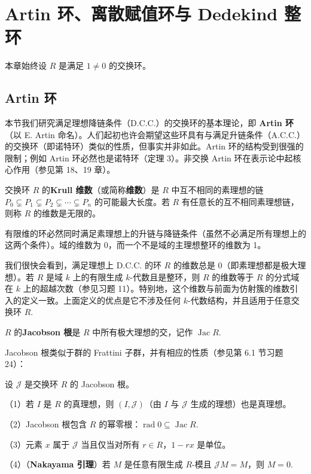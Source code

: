 
\setcounter{chapter}{15}

\chapter{Artin 环、离散赋值环与 Dedekind 整环}

本章始终设 \(R\) 是满足 \(1 \neq 0\) 的交换环。

\section{Artin 环}

本节我们研究满足理想降链条件（D.C.C.）的交换环的基本理论，即 \textbf{Artin 环}（以 E. Artin 命名）。人们起初也许会期望这些环具有与满足升链条件（A.C.C.）的交换环（即诺特环）类似的性质，但事实并非如此。Artin 环的结构受到很强的限制；例如 Artin 环必然也是诺特环（定理 3）。非交换 Artin 环在表示论中起核心作用（参见第 18、19 章）。

\begin{definition}
交换环 \(R\) 的\textbf{Krull 维数}（或简称\textbf{维数}）是 \(R\) 中互不相同的素理想的链 \(P_0 \subsetneq P_1 \subsetneq P_2 \subsetneq \cdots \subsetneq P_n\) 的可能最大长度。若 \(R\) 有任意长的互不相同素理想链，则称 \(R\) 的维数是无限的。
\end{definition}

有限维的环必然同时满足素理想上的升链与降链条件（虽然不必满足所有理想上的这两个条件）。域的维数为 0，而一个不是域的主理想整环的维数为 1。

我们很快会看到，满足理想上 D.C.C. 的环 \(R\) 的维数总是 0（即素理想都是极大理想）。若 \(R\) 是域 \(k\) 上的有限生成 \(k\)-代数且是整环，则 \(R\) 的维数等于 \(R\) 的分式域在 \(k\) 上的超越次数（参见习题 11）。特别地，这个维数与前面为仿射簇的维数引入的定义一致。上面定义的优点是它不涉及任何 \(k\)-代数结构，并且适用于任意交换环 \(R\).

\begin{definition}
\(R\) 的\textbf{Jacobson 根}是 \(R\) 中所有极大理想的交，记作 \(\operatorname{Jac}R\).
\end{definition}

Jacobson 根类似于群的 Frattini 子群，并有相应的性质（参见第 6.1 节习题 24）：

\begin{proposition}\label{pro:16.1}
设 \(\mathcal{J}\) 是交换环 \(R\) 的 Jacobson 根。

（1）若 \(I\) 是 \(R\) 的真理想，则 \((I, \mathcal{J})\)（由 \(I\) 与 \(\mathcal{J}\) 生成的理想）也是真理想。

（2）Jacobson 根包含 \(R\) 的幂零根：\(\operatorname{rad}0 \subseteq \operatorname{Jac}R\).

（3）元素 \(x\) 属于 \(\mathcal{J}\) 当且仅当对所有 \(r \in R\)，\(1-rx\) 是单位。

（4）（\textbf{Nakayama 引理}）若 \(M\) 是任意有限生成 \(R\)-模且 \(\mathcal{J}M = M\)，则 \(M = 0\).
\end{proposition}


